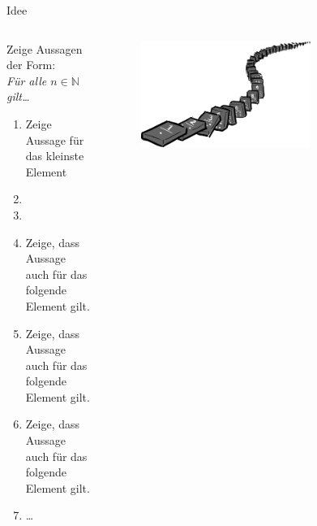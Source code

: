 \begin{frame}[fragile]{Idee}
\begin{columns}
    \begin{alertblock}{Zeige Aussagen der Form:\\\emph{Für alle $n\in\mathbb{N}$ gilt\ldots}}
    \begin{enumerate}
        \item Zeige Aussage für das kleinste Element
        \item<1-> 
        \item<2-6,8> 
        \item<3-6> \footnotesize Zeige, dass Aussage auch für das folgende Element gilt.
        \item<4-6> \scriptsize Zeige, dass Aussage auch für das folgende Element gilt.
        \item<5-6> \tiny Zeige, dass Aussage auch für das folgende Element gilt.
        \item<6> \dots
    \end{enumerate}
    \end{alertblock}
    \begin{figure}
        \centering
        \includegraphics[width=0.7\textwidth]{../figures/induction.png}
    \end{figure}
\end{columns}
\end{frame}

